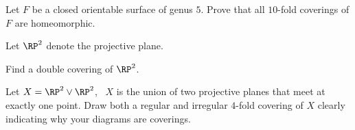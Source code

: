 \begin{alist}
\item Let $F$ be a closed orientable surface of genus $5$. Prove that
all $10$-fold coverings of $F$ are homeomorphic.
\item Let $\RP^2$ denote the projective plane.  
\begin{rlist}
\item Find a double covering of $\RP^2$.
\item Let $X=\RP^2\vee \RP^2$, \ie\ $X$ is the union of two projective
planes that meet at exactly one point. Draw both a regular and
irregular $4$-fold covering of $X$ clearly indicating why your diagrams
are coverings.
\end{rlist}
\end{alist}
